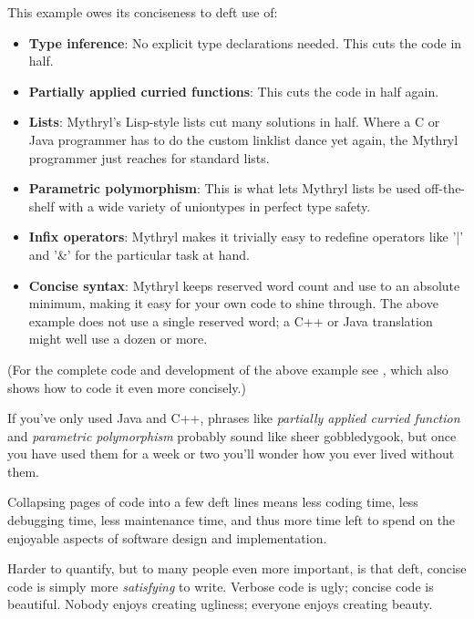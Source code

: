 This example owes its conciseness to deft use of: 

\begin{itemize}
\item {\bf Type inference}:  No explicit type declarations needed. This cuts the code in half. 
\item {\bf Partially applied curried functions}:  This cuts the code in half again. 
\item {\bf Lists}:  Mythryl's Lisp-style lists cut many solutions in half.
                    Where a C or Java programmer has to do the custom linklist dance 
                    yet again, the Mythryl programmer just reaches for standard lists. 
\item {\bf Parametric polymorphism}:  This is what lets Mythryl lists be used off-the-shelf 
                    with a wide variety of uniontypes in perfect type safety. 
\item {\bf Infix operators}:  Mythryl makes it trivially easy to redefine operators 
                    like '|' and '\&' for the particular task at hand.  
\item {\bf Concise syntax}:  Mythryl keeps reserved word count and use to an 
                    absolute minimum, making it easy for your own code to shine through. 
                    The above example does not use a single reserved word;  a C++ or Java translation 
                    might well use a dozen or more. 
\end{itemize}

(For the complete code and development of the above example 
see , which 
also shows how to code it even more concisely.)

If you've only used Java and C++, phrases like {\it partially applied curried function} 
and {\it parametric polymorphism} probably sound like sheer gobbledygook, but once you 
have used them for a week or two you'll wonder how you ever lived without them.

Collapsing pages of code into a few deft lines means less coding time, 
less debugging time, less maintenance time, and thus more time left to spend 
on the enjoyable aspects of software design and implementation.

Harder to quantify, but to many people even more important, is that 
deft, concise code is simply more {\it satisfying} to write.  Verbose 
code is ugly; concise code is beautiful.  Nobody enjoys creating 
ugliness; everyone enjoys creating beauty.

